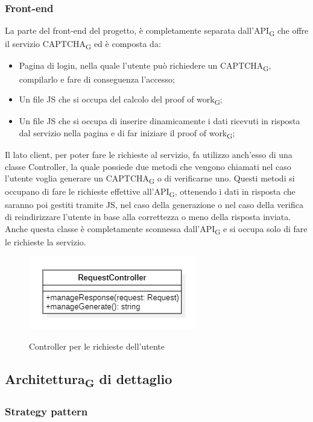 \subsubsection{Front-end}
La parte del front-end del progetto, è completamente separata dall'API\textsubscript{G} che offre il servizio CAPTCHA\textsubscript{G} ed è composta da:
\begin{itemize}
	\item Pagina di login, nella quale l'utente può richiedere un CAPTCHA\textsubscript{G}, 
    compilarlo e fare di conseguenza l'accesso;
    \item Un file JS che si occupa del calcolo del proof of work\textsubscript{G};
    \item Un file JS che si occupa di inserire dinamicamente i dati ricevuti in risposta dal servizio nella pagina e di far iniziare il proof of work\textsubscript{G};
\end{itemize}
Il lato client, per poter fare le richieste al servizio, fa utilizzo anch'esso di una classe Controller, la quale possiede due metodi che vengono chiamati nel caso l'utente voglia generare un CAPTCHA\textsubscript{G} o di verificarne uno. Questi metodi si occupano di fare le richieste effettive all'API\textsubscript{G}, ottenendo i dati in risposta che saranno poi gestiti tramite JS, nel caso della generazione o nel caso della verifica di reindirizzare l'utente in base alla correttezza o meno della risposta inviata.
Anche questa classe è completamente sconnessa dall'API\textsubscript{G} e si occupa solo di fare le richieste la servizio. 

\begin{figure}[H]
	\centering
	\includegraphics[scale = 0.8]{img/request_controller.png}\\
	\caption{Controller per le richieste dell'utente}
\end{figure}

\subsection{Architettura\textsubscript{G} di dettaglio}

\subsubsection{Strategy pattern}

